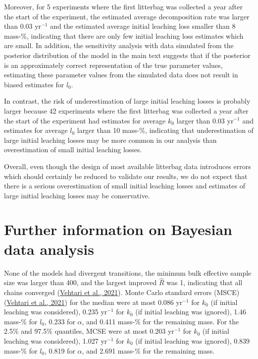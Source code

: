 \documentclass[
  12pt,
]{article}
\begin{document}
Moreover, for 5 experiments where the first litterbag was collected a year after the start of the experiment, the estimated average decomposition rate was larger than 0.03 yr\(^{-1}\) and the estimated average initial leaching loss smaller than 8 mass-\%, indicating that there are only few initial leaching loss estimates which are small. In addition, the sensitivity analysis with data simulated from the posterior distribution of the model in the main text suggests that if the posterior is an approximately correct representation of the true parameter values, estimating these parameter values from the simulated data does not result in biased estimates for \(l_0\).

In contrast, the risk of underestimation of large initial leaching losses is probably larger because 42 experiments where the first litterbag was collected a year after the start of the experiment had estimates for average \(k_0\) larger than 0.03 yr\(^{-1}\) and estimates for average \(l_0\) larger than 10 mass-\%, indicating that underestimation of large initial leaching losses may be more common in our analysis than overestimation of small initial leaching losses.

Overall, even though the design of most available litterbag data introduces errors which should certainly be reduced to validate our results, we do not expect that there is a serious overestimation of small initial leaching losses and estimates of large initial leaching losses may be conservative.

\hypertarget{sup-14}{%
\section{Further information on Bayesian data analysis}\label{sup-14}}

None of the models had divergent transitions, the minimum bulk effective sample size was larger than 400, and the largest improved \(\hat{R}\) was 1, indicating that all chains converged (\protect\hyperlink{ref-Vehtari.2021}{Vehtari et al., 2021}). Monte Carlo standard errors (MSCE) (\protect\hyperlink{ref-Vehtari.2021}{Vehtari et al., 2021}) for the median were at most 0.086 yr\(^{-1}\) for \(k_0\) (if initial leaching was considered), 0.235 yr\(^{-1}\) for \(k_0\) (if initial leaching was ignored), 1.46 mass-\% for \(l_0\), 0.233 for \(\alpha\), and 0.411 mass-\% for the remaining mass. For the 2.5\% and 97.5\% quantiles, MCSE were at most 0.203 yr\(^{-1}\) for \(k_0\) (if initial leaching was considered), 1.027 yr\(^{-1}\) for \(k_0\) (if initial leaching was ignored), 0.839 mass-\% for \(l_0\), 0.819 for \(\alpha\), and 2.691 mass-\% for the remaining mass.
\end{document}
